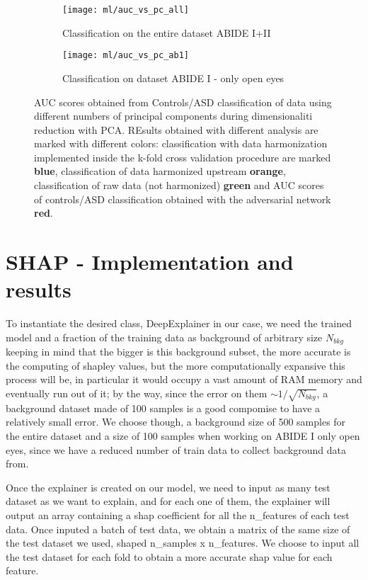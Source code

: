 \documentclass[12pt]{report}
\begin{document}
\begin{figure}
\centering
\begin{subfigure}{0.4\textwidth}
   \texttt{[image: ml/auc\_vs\_pc\_all]}
   \caption{Classification on the entire dataset ABIDE I+II}
   \label{}
\end{subfigure}
\begin{subfigure}{0.4\textwidth}
   \texttt{[image: ml/auc\_vs\_pc\_ab1]}
   \caption{Classification on dataset ABIDE I - only open eyes}
   \label{}
\end{subfigure}
\caption{AUC scores obtained from Controls/ASD classification of data using different numbers of principal components during dimensionaliti reduction with PCA.
REsults obtained with different analysis are marked with different colors: classification with data harmonization implemented inside the k-fold cross validation procedure are marked \textbf{blue}, classification of data harmonized upstream \textbf{orange}, classification of raw data (not harmonized) \textbf{green} and AUC scores of controls/ASD classification obtained with the adversarial network \textbf{red}.
}
\label{fig:classification_pearson_pca}
\end{figure}




\newpage


\chapter{SHAP - Implementation and results}


To instantiate the desired class, DeepExplainer in our case, we need the trained model and a fraction of the training data as background of arbitrary size $N_{bkg}$ keeping in mind that the bigger is this background subset, the more accurate is the computing of shapley values, but the more computationally expansive this process will be, in particular it would occupy a vast amount of RAM memory and eventually run out of it; by the way, since the error on them $\sim 1/\sqrt{N_{bkg}}$, a background dataset made of 100 samples is a good compomise to have a relatively small error.
We choose though, a background size of 500 samples for the entire dataset and a size of 100 samples when working on ABIDE I only open eyes, since we have a reduced number of train data to collect background data from.

Once the explainer is created on our model, we need to input as many test dataset as we want to explain, and for each one of them, the explainer will output an array containing a shap coefficient for all the n\_features of each test data.
Once inputed a batch of test data, we obtain a matrix of the same size of the test dataset we used, shaped n\_samples x n\_features.
We choose to input all the test dataset for each fold to obtain a more accurate shap value for each feature.
\end{document}
